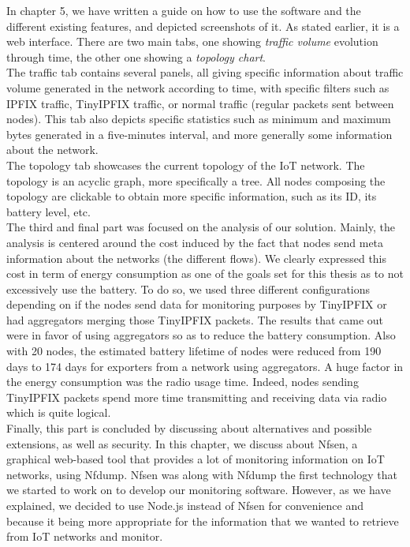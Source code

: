 In chapter 5, we have written a guide on how to use the software and the different existing features, and depicted screenshots of it. As stated earlier, it is a web interface. There are two main tabs, one showing \textit{traffic volume} evolution through time, the other one showing a \textit{topology chart}. \\

The traffic tab contains several panels, all giving specific information about traffic volume generated in the network according to time, with specific filters such as IPFIX traffic, TinyIPFIX traffic, or normal traffic (regular packets sent between nodes). This tab also depicts specific statistics such as minimum and maximum bytes generated in a five-minutes interval, and more generally some information about the network. \\

The topology tab showcases the current topology of the IoT network. The topology is an acyclic graph, more specifically a tree. All nodes composing the topology are clickable to obtain more specific information, such as its ID, its battery level, etc.\\

The third and final part was focused on the analysis of our solution. Mainly, the analysis is centered around the cost induced by the fact that nodes send meta information about the networks (the different flows). We clearly expressed this cost in term of energy consumption as one of the goals set for this thesis as to not excessively use the battery. To do so, we used three different configurations depending on if the nodes send data for monitoring purposes by TinyIPFIX or had aggregators merging those TinyIPFIX packets. The results that came out were in favor of using aggregators so as to reduce the battery consumption. Also with 20 nodes, the estimated battery lifetime of nodes were reduced from 190 days to 174 days for exporters from a network using aggregators. A huge factor in the energy consumption was the radio usage time. Indeed, nodes sending TinyIPFIX packets spend more time transmitting and receiving data via radio which is quite logical.\\

Finally, this part is concluded by discussing about alternatives and possible extensions, as well as security. In this chapter, we discuss about Nfsen, a graphical web-based tool that provides a lot of monitoring information on IoT networks, using Nfdump. Nfsen was along with Nfdump the first technology that we started to work on to develop our monitoring software. However, as we have explained, we decided to use Node.js instead of Nfsen for convenience and because it being more appropriate for the information that we wanted to retrieve from IoT networks and monitor. \\

